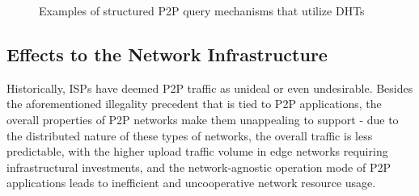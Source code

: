 \begin{figure}%
\centering
{}%
\qquad
{}%
\caption{Examples of structured P2P query mechanisms that utilize DHTs}
\label{fig:dht-usage}
\end{figure}

\subsection{Effects to the Network Infrastructure}

    Historically, ISPs have deemed P2P traffic as unideal or even undesirable.
    Besides the aforementioned illegality precedent that is tied to P2P applications, the overall properties of P2P networks make them unappealing to support - due to the distributed nature of these types of networks, the overall traffic is less predictable, with the higher upload traffic volume in edge networks requiring infrastructural investments, and the network-agnostic operation mode of P2P applications leads to inefficient and uncooperative network resource usage.


